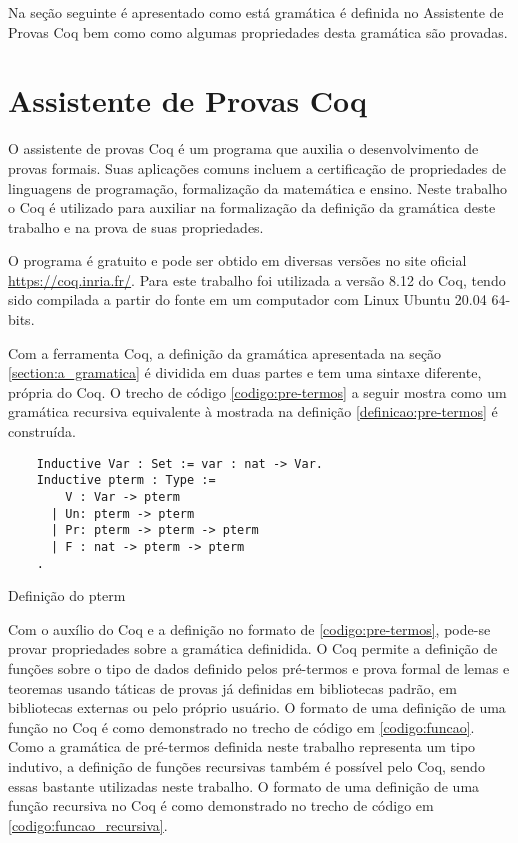 \documentclass{article}
\newenvironment{codigo}{\captionsetup{type=listing}}{}
\begin{document}
Na seção seguinte é apresentado como está gramática é definida no Assistente de Provas Coq bem como como algumas propriedades desta gramática são provadas.


\section{Assistente de Provas Coq}
\label{section:assistente_coq}

O assistente de provas Coq é um programa que auxilia o desenvolvimento de provas formais. Suas aplicações comuns incluem a certificação de propriedades de linguagens de programação, formalização da matemática e ensino. Neste trabalho o Coq é utilizado para auxiliar na formalização da definição da gramática deste trabalho e na prova de suas propriedades. %

O programa é gratuito e pode ser obtido em diversas versões no site oficial \url{https://coq.inria.fr/}. Para este trabalho foi utilizada a versão 8.12 do Coq, tendo sido compilada a partir do fonte em um computador com Linux Ubuntu 20.04 64-bits.

Com a ferramenta Coq, a definição da gramática apresentada na seção \ref{section:a_gramatica} é dividida em duas partes e tem uma sintaxe diferente, própria do Coq. O trecho de código \ref{codigo:pre-termos} a seguir mostra como um gramática recursiva equivalente à mostrada na definição \ref{definicao:pre-termos} é construída.

\begin{codigo}
\begin{verbatim}
	Inductive Var : Set := var : nat -> Var.
	Inductive pterm : Type :=
	    V : Var -> pterm
	  | Un: pterm -> pterm
	  | Pr: pterm -> pterm -> pterm
	  | F : nat -> pterm -> pterm
	.
\end{verbatim}
\caption{Definição do pterm}
\label{codigo:pre-termos}
\end{codigo}

Com o auxílio do Coq e a definição no formato de \ref{codigo:pre-termos}, pode-se provar propriedades sobre a gramática definidida. O Coq permite a definição de funções sobre o tipo de dados definido pelos pré-termos e prova formal de lemas e teoremas usando táticas de provas já definidas em bibliotecas padrão, em bibliotecas externas ou pelo próprio usuário. O formato de uma definição de uma função no Coq é como demonstrado no trecho de código em \ref{codigo:funcao}. Como a gramática de pré-termos definida neste trabalho representa um tipo indutivo, a definição de funções recursivas também é possível pelo Coq, sendo essas bastante utilizadas neste trabalho. O formato de uma definição de uma função recursiva no Coq é como demonstrado no trecho de código em \ref{codigo:funcao_recursiva}. 
\end{document}
